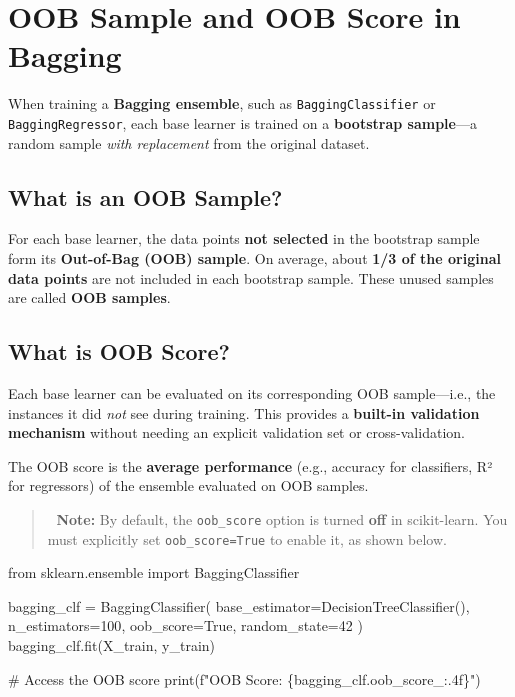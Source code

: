 \documentclass[
  letterpaper,
  DIV=11,
  numbers=noendperiod]{scrreprt}
\newenvironment{Shaded}{\begin{snugshade}}{\end{snugshade}}
\newcommand{\BuiltInTok}[1]{\textcolor[rgb]{0.00,0.23,0.31}{#1}}
\newcommand{\CommentTok}[1]{\textcolor[rgb]{0.37,0.37,0.37}{#1}}
\newcommand{\DecValTok}[1]{\textcolor[rgb]{0.68,0.00,0.00}{#1}}
\newcommand{\ImportTok}[1]{\textcolor[rgb]{0.00,0.46,0.62}{#1}}
\newcommand{\NormalTok}[1]{\textcolor[rgb]{0.00,0.23,0.31}{#1}}
\newcommand{\OperatorTok}[1]{\textcolor[rgb]{0.37,0.37,0.37}{#1}}
\newcommand{\SpecialCharTok}[1]{\textcolor[rgb]{0.37,0.37,0.37}{#1}}
\newcommand{\SpecialStringTok}[1]{\textcolor[rgb]{0.13,0.47,0.30}{#1}}
\newcommand{\VariableTok}[1]{\textcolor[rgb]{0.07,0.07,0.07}{#1}}
\begin{document}
\section{OOB Sample and OOB Score in
Bagging}\label{oob-sample-and-oob-score-in-bagging}

When training a \textbf{Bagging ensemble}, such as
\texttt{BaggingClassifier} or \texttt{BaggingRegressor}, each base
learner is trained on a \textbf{bootstrap sample}---a random sample
\emph{with replacement} from the original dataset.

\subsection{What is an OOB Sample?}\label{what-is-an-oob-sample}

For each base learner, the data points \textbf{not selected} in the
bootstrap sample form its \textbf{Out-of-Bag (OOB) sample}. On average,
about \textbf{1/3 of the original data points} are not included in each
bootstrap sample. These unused samples are called \textbf{OOB samples}.

\subsection{What is OOB Score?}\label{what-is-oob-score}

Each base learner can be evaluated on its corresponding OOB
sample---i.e., the instances it did \emph{not} see during training. This
provides a \textbf{built-in validation mechanism} without needing an
explicit validation set or cross-validation.

The OOB score is the \textbf{average performance} (e.g., accuracy for
classifiers, R² for regressors) of the ensemble evaluated on OOB
samples.

\begin{quote}
🔧 \textbf{Note:} By default, the \texttt{oob\_score} option is turned
\textbf{off} in scikit-learn. You must explicitly set
\texttt{oob\_score=True} to enable it, as shown below.
\end{quote}

\begin{Shaded}
\begin{Highlighting}[]
\ImportTok{from}\NormalTok{ sklearn.ensemble }\ImportTok{import}\NormalTok{ BaggingClassifier}

\NormalTok{bagging\_clf }\OperatorTok{=}\NormalTok{ BaggingClassifier(}
\NormalTok{    base\_estimator}\OperatorTok{=}\NormalTok{DecisionTreeClassifier(),}
\NormalTok{    n\_estimators}\OperatorTok{=}\DecValTok{100}\NormalTok{,}
\NormalTok{    oob\_score}\OperatorTok{=}\VariableTok{True}\NormalTok{,}
\NormalTok{    random\_state}\OperatorTok{=}\DecValTok{42}
\NormalTok{)}
\NormalTok{bagging\_clf.fit(X\_train, y\_train)}

\CommentTok{\# Access the OOB score}
\BuiltInTok{print}\NormalTok{(}\SpecialStringTok{f"OOB Score: }\SpecialCharTok{\{}\NormalTok{bagging\_clf}\SpecialCharTok{.}\NormalTok{oob\_score\_}\SpecialCharTok{:.4f\}}\SpecialStringTok{"}\NormalTok{)}
\end{Highlighting}
\end{Shaded}
\end{document}
